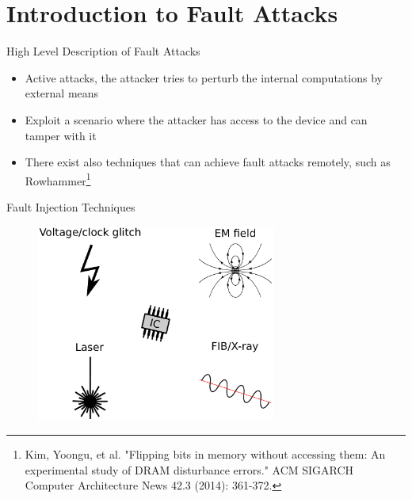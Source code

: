 \section{Introduction to Fault Attacks}
\begin{frame}{\VideoName}
    \tableofcontents[currentsection]
\end{frame}

\begin{frame}{High Level Description of Fault Attacks}
    \begin{itemize}
        \item Active attacks, the attacker tries to perturb the internal computations by external means
        \item Exploit a scenario where the attacker has access to the device and can tamper with it
        \item There exist also techniques that can achieve fault attacks remotely, such as Rowhammer\footnote{Kim, Yoongu, et al. "Flipping bits in memory without accessing them: An experimental study of DRAM disturbance errors." ACM SIGARCH Computer Architecture News 42.3 (2014): 361-372.}
    \end{itemize}
    
\end{frame}

\begin{frame}{Fault Injection Techniques}
\begin{figure}
\includegraphics[width=0.7\textwidth]{fig/FA_techniques}
\end{figure}
\end{frame}

